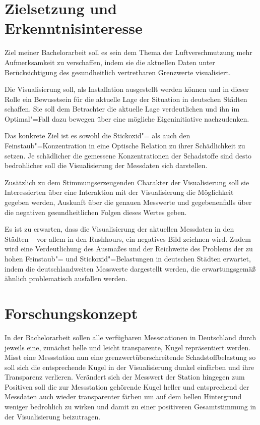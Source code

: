 \documentclass[12pt]{article} %
\begin{document}
\section{Zielsetzung und Erkenntnisinteresse} \label{sec:Zielsetzung}

Ziel meiner Bachelorarbeit soll es sein dem Thema der Luftverschmutzung mehr Aufmerksamkeit zu verschaffen, indem sie die aktuellen Daten unter Berücksichtigung des gesundheitlich vertretbaren Grenzwerte visualisiert.

Die Visualisierung soll, als Installation ausgestellt werden können und in dieser Rolle ein Bewusstsein für die aktuelle Lage der Situation in deutschen Städten schaffen.
Sie soll dem Betrachter die aktuelle Lage verdeutlichen und ihn im Optimal"=Fall dazu bewegen über eine mögliche Eigeninitiative nachzudenken.

Das konkrete Ziel ist es sowohl die Stickoxid"= als auch den Feinstaub"=Konzentration in eine Optische Relation zu ihrer Schädlichkeit zu setzen. 
Je schädlicher die gemessene Konzentrationen der Schadstoffe sind desto bedrohlicher soll die Visualisierung der Messdaten sich darstellen.

Zusätzlich zu dem Stimmungserzeugenden Charakter der Visualisierung soll sie Interessierten über eine Interaktion mit der Visualisierung die Möglichkeit gegeben werden, Auskunft über die genauen Messwerte und gegebenenfalls über die negativen gesundheitlichen Folgen dieses Wertes geben.

Es ist zu erwarten, dass die Visualisierung der aktuellen Messdaten in den Städten – vor allem in den Rushhours, ein negatives Bild zeichnen wird.
Zudem wird eine Verdeutlichung des Ausmaßes und der Reichweite des Problems der zu hohen Feinstaub"= und Stickoxid"=Belastungen in deutschen Städten erwartet, indem die deutschlandweiten Messwerte dargestellt werden, die erwartungsgemäß ähnlich problematisch ausfallen werden.

\section{Forschungskonzept} \label{sec:Forschungskonzept}

In der Bachelorarbeit sollen alle verfügbaren Messstationen in Deutschland durch jeweils eine, zunächst helle und leicht transparente, Kugel repräsentiert werden.
Misst eine Messstation nun eine grenzwertüberschreitende Schadstoffbelastung so soll sich die entsprechende Kugel in der Visualisierung dunkel einfärben und ihre Transparenz verlieren.   
Verändert sich der Messwert der Station hingegen zum Positiven soll die zur Messstation gehörende Kugel heller und entsprechend der Messdaten auch wieder transparenter färben um auf dem hellen Hintergrund weniger bedrohlich zu wirken und damit zu einer positiveren Gesamtstimmung in der Visualisierung beizutragen.
\end{document}
